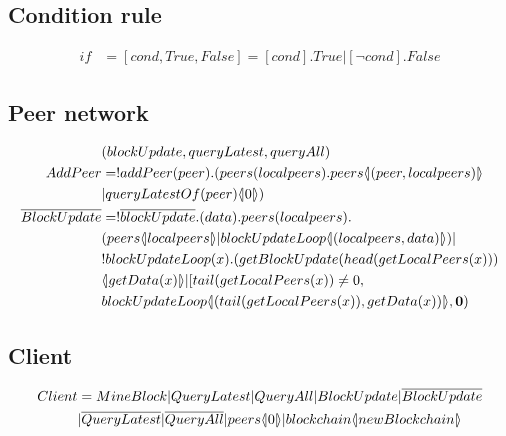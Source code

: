 \subsection{Condition rule}

\begin{align*}
    if &= [cond,True,False] = [cond].True|[\neg cond].False
\end{align*}

\subsection{Peer network}

\begin{align*}
    &(blockUpdate, queryLatest, queryAll)\\
    AddPeer &= !addPeer(peer).(peers(localpeers).peers\lift{}{(peer,localpeers)}\\
        &|queryLatestOf(peer)\lift{}{0})\\
    \overline{BlockUpdate} &= !\overline{blockUpdate}.(data).peers(localpeers).\\
        &(peers\lift{}{localpeers}|blockUpdateLoop\lift{}{(localpeers,data)})|\\
        &!blockUpdateLoop(x).(getBlockUpdate(head(getLocalPeers(x)))\\
        &\lift{}{getData(x)}|[tail(getLocalPeers(x))\not= 0,\\
        &blockUpdateLoop\lift{}{(tail(getLocalPeers(x)),getData(x))},\nil)
\end{align*}

\subsection{Client}

\begin{align*}
    Client &= MineBlock|QueryLatest|QueryAll|BlockUpdate|\overline{BlockUpdate}\\
    &|\overline{QueryLatest}|\overline{QueryAll}|peers \langle \! | 0 | \! \rangle|blockchain \langle \! | newBlockchain | \! \rangle
\end{align*}